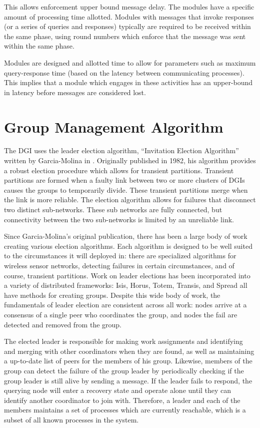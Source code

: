 This allows enforcement upper bound message delay. The modules have a specific
amount of processing time allotted. Modules with messages that invoke responses
(or a series of queries and responses) typically are required to be received
within the same phase, using round numbers which enforce that the message was
sent within the same phase.

Modules are designed and allotted time to allow for parameters such as maximum
query-response time (based on the latency between communicating processes). 
This implies that a module which engages in these activities has an
upper-bound in latency before messages are considered lost.
\section{Group Management Algorithm}

The DGI uses the leader election algorithm, ``Invitation Election
Algorithm'' written by Garcia-Molina in \cite{INVITATIONELECTION}.
Originally published in 1982, his algorithm provides a robust election
procedure which allows for transient
partitions. Transient partitions are formed when a faulty link between two or
more clusters of DGIs causes the groups to temporarily divide. These transient
partitions merge when the link is more reliable. The election algorithm
allows for failures that disconnect two distinct sub-networks. These sub
networks are fully connected, but connectivity between the two sub-networks is
limited by an unreliable link.

Since Garcia-Molina's original publication, there has been a large body of
work creating various election algorithms. Each algorithm is
designed to be well suited to the circumstances it will deployed in: there are
specialized algorithms for wireless sensor
networks\cite{LE-WSN-1}\cite{LE-WSN-2}, detecting failures in
certain
circumstances\cite{LE-SPECIALCIRCUMSTANCES-1}\cite{LE-SPECIALCIRCUMSTANCES-2}, and of course, transient partitions. Work on leader
elections has been incorporated into a variety of distributed frameworks:
Isis\cite{ISISTOOLKIT},
Horus\cite{HORUSTOOLKIT}, Totem\cite{TOTEMTOOLKIT},
Transis\cite{TRANSISTOOLKIT}, and Spread\cite{SPREADTOOLKIT} all have methods for creating groups. Despite
this wide body of work, the fundamentals of leader election are consistent
across all work: nodes arrive at a consensus of a single peer who coordinates
the group, and nodes the fail are detected and removed from the group.

The elected leader is responsible for making work assignments and identifying 
and merging with other coordinators when they are found, as well as maintaining 
a up-to-date list of peers for the members of his group.  Likewise, members of 
the group can detect the failure of the group leader by periodically checking 
if the group leader is still alive by sending a message. If the leader fails to 
respond, the querying node will enter a recovery state and operate alone until 
they can identify another coordinator to join with. Therefore, a leader and each
of the members maintains a set of processes which are currently reachable, which
is a subset of all known processes in the system.

